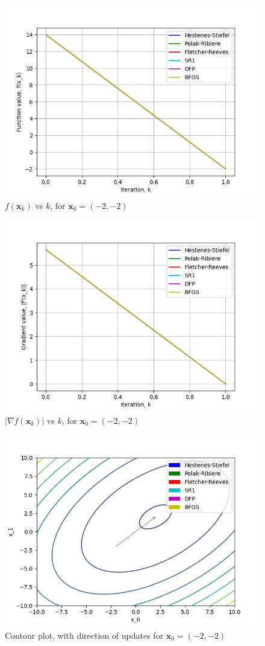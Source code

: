 \documentclass[a4paper]{article}
\begin{document}
\begin{figure}[H]
    \centering
    \includegraphics[width=.65\textwidth]{images/trid_function_vals.png}
    \caption{$f(\textbf{x}_k)$ vs $k$, for $\textbf{x}_0 = (-2, -2)$}
\end{figure}

\begin{figure}[H]
    \centering
    \includegraphics[width=.65\textwidth]{images/trid_function_grad.png}
    \caption{$|\nabla f(\textbf{x}_k)|$ vs $k$, for $\textbf{x}_0 = (-2, -2)$}
\end{figure}

\begin{figure}[H]
    \centering
    \includegraphics[width=.65\textwidth]{images/trid_function_cont.png}
    \caption{Contour plot, with direction of updates for $\textbf{x}_0 = (-2, -2)$}
\end{figure}
\end{document}
